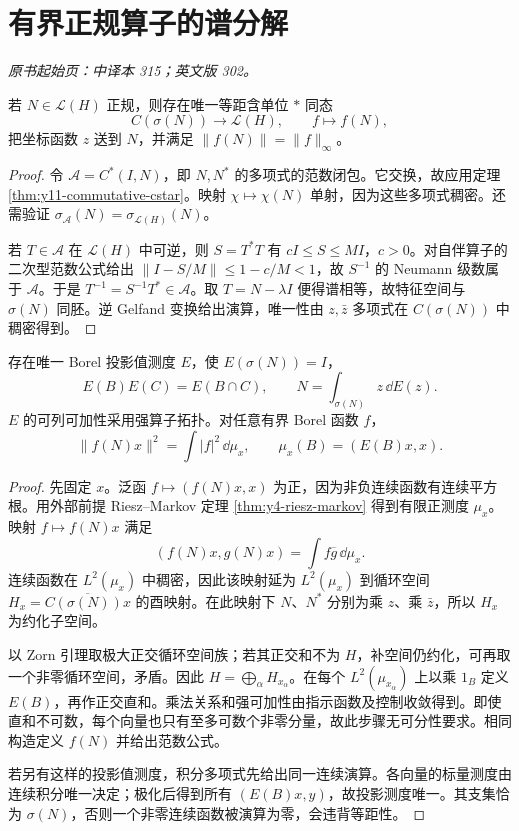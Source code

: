 \section{有界正规算子的谱分解}\label{sec:yosida-11-03}
\noindent\textit{原书起始页：中译本 315；英文版 302。}

\begin{theorem}[连续函数演算]\label{thm:y11-continuous-calculus}
若 $N\in\mathcal L(H)$ 正规，则存在唯一等距含单位 $*$ 同态
\[
 C(\sigma(N))\longrightarrow\mathcal L(H),\qquad f\longmapsto f(N),
\]
把坐标函数 $z$ 送到 $N$，并满足 $\|f(N)\|=\|f\|_\infty$。
\end{theorem}
\begin{proof}
令 $\mathcal A=C^*(I,N)$，即 $N,N^*$ 的多项式的范数闭包。它交换，故应用定理 \ref{thm:y11-commutative-cstar}。映射 $\chi\mapsto\chi(N)$ 单射，因为这些多项式稠密。还需验证 $\sigma_{\mathcal A}(N)=\sigma_{\mathcal L(H)}(N)$。

若 $T\in\mathcal A$ 在 $\mathcal L(H)$ 中可逆，则 $S=T^*T$ 有 $cI\le S\le MI$，$c>0$。对自伴算子的二次型范数公式给出 $\|I-S/M\|\le1-c/M<1$，故 $S^{-1}$ 的 Neumann 级数属于 $\mathcal A$。于是 $T^{-1}=S^{-1}T^*\in\mathcal A$。取 $T=N-\lambda I$ 便得谱相等，故特征空间与 $\sigma(N)$ 同胚。逆 Gelfand 变换给出演算，唯一性由 $z,\bar z$ 多项式在 $C(\sigma(N))$ 中稠密得到。
\end{proof}

\begin{theorem}[正规算子的投影值测度]\label{thm:y11-normal-pvm}
存在唯一 Borel 投影值测度 $E$，使 $E(\sigma(N))=I$，
\[
 E(B)E(C)=E(B\cap C),\qquad
 N=\int_{\sigma(N)}z\,\dd E(z).
\]
$E$ 的可列可加性采用强算子拓扑。对任意有界 Borel 函数 $f$，
\[
 \|f(N)x\|^2=\int|f|^2\,\dd\mu_x,\qquad
 \mu_x(B)=(E(B)x,x).
\]
\end{theorem}
\begin{proof}
先固定 $x$。泛函 $f\mapsto(f(N)x,x)$ 为正，因为非负连续函数有连续平方根。用外部前提 Riesz--Markov 定理 \ref{thm:y4-riesz-markov} 得到有限正测度 $\mu_x$。映射 $f\mapsto f(N)x$ 满足
\[
 (f(N)x,g(N)x)=\int f\overline g\,\dd\mu_x.
\]
连续函数在 $L^2(\mu_x)$ 中稠密，因此该映射延为 $L^2(\mu_x)$ 到循环空间 $H_x=\overline{C(\sigma(N))x}$ 的酉映射。在此映射下 $N$、$N^*$ 分别为乘 $z$、乘 $\bar z$，所以 $H_x$ 为约化子空间。

以 Zorn 引理取极大正交循环空间族；若其正交和不为 $H$，补空间仍约化，可再取一个非零循环空间，矛盾。因此 $H=\bigoplus_\alpha H_{x_\alpha}$。在每个 $L^2(\mu_{x_\alpha})$ 上以乘 $1_B$ 定义 $E(B)$，再作正交直和。乘法关系和强可加性由指示函数及控制收敛得到。即使直和不可数，每个向量也只有至多可数个非零分量，故此步骤无可分性要求。相同构造定义 $f(N)$ 并给出范数公式。

若另有这样的投影值测度，积分多项式先给出同一连续演算。各向量的标量测度由连续积分唯一决定；极化后得到所有 $(E(B)x,y)$，故投影测度唯一。其支集恰为 $\sigma(N)$，否则一个非零连续函数被演算为零，会违背等距性。
\end{proof}

